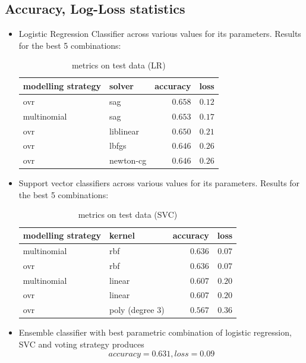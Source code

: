 \documentclass[fleqn,10pt]{SelfArx} %
\begin{document}
\subsection{Accuracy, Log-Loss statistics}
\begin{itemize}
	\item Logistic Regression Classifier across various values for its parameters. Results for the best 5 combinations:
	\begin{table}[H]
		\caption{metrics on test data (LR)}
		\centering
		\begin{tabular}{llrr}
			\toprule
			modelling strategy & solver & accuracy & loss \\ 
			\midrule
			ovr & sag & $0.658$ & $0.12$ \\
			multinomial & sag & $0.653$ & $0.17$ \\
			ovr & liblinear & $0.650$ & $0.21$ \\
			ovr & lbfgs & $0.646$ & $0.26$ \\
			ovr & newton-cg & $0.646$ & $0.26$ \\
			\bottomrule
		\end{tabular}
		\label{tab:label}
	\end{table}
	\item Support vector classifiers across various values for its parameters. Results for the best 5 combinations:
	\begin{table}[H]
		\caption{metrics on test data (SVC)}
		\centering
		\begin{tabular}{llrr}
			\toprule
			modelling strategy & kernel & accuracy & loss \\ 
			\midrule
			multinomial & rbf & $0.636$ & $0.07$ \\
			ovr & rbf & $0.636$ & $0.07$ \\
			multinomial & linear & $0.607$ & $0.20$ \\
			ovr & linear & $0.607$ & $0.20$ \\
			ovr & poly (degree 3) & $0.567$ & $0.36$ \\
			\bottomrule
		\end{tabular}
		\label{tab:label}
	\end{table}
	\item Ensemble classifier with best parametric combination of logistic regression, SVC and voting strategy produces
	$$accuracy = 0.631, loss = 0.09$$

\end{itemize}
\end{document}
